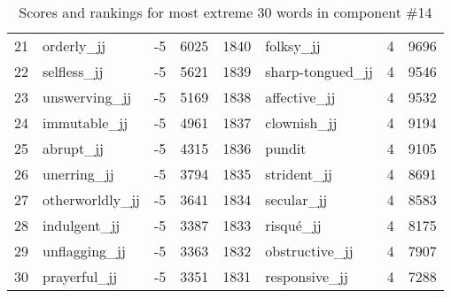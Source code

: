 \begin{table}[tbp]
\begin{tabular}{| rlr@{.}l | rlr@{.}l |}
    21 & orderly\_jj & -5 & 6025    &    1840 & folksy\_jj & 4 & 9696 \\
    22 & selfless\_jj & -5 & 5621    &    1839 & sharp-tongued\_jj & 4 & 9546 \\
    23 & unswerving\_jj & -5 & 5169    &    1838 & affective\_jj & 4 & 9532 \\
    24 & immutable\_jj & -5 & 4961    &    1837 & clownish\_jj & 4 & 9194 \\
    25 & abrupt\_jj & -5 & 4315    &    1836 & pundit & 4 & 9105 \\
    26 & unerring\_jj & -5 & 3794    &    1835 & strident\_jj & 4 & 8691 \\
    27 & otherworldly\_jj & -5 & 3641    &    1834 & secular\_jj & 4 & 8583 \\
    28 & indulgent\_jj & -5 & 3387    &    1833 & risqué\_jj & 4 & 8175 \\
    29 & unflagging\_jj & -5 & 3363    &    1832 & obstructive\_jj & 4 & 7907 \\
    30 & prayerful\_jj & -5 & 3351    &    1831 & responsive\_jj & 4 & 7288 \\
    \hline
    \end{tabular}
    \caption{Scores and rankings for most extreme 30 words in component \#14} 
\end{table}
\clearpage
